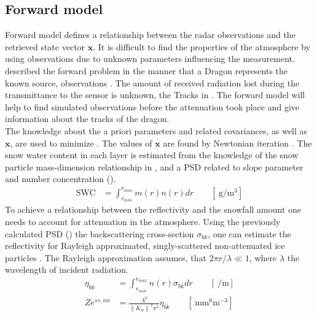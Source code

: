 \subsection{Forward model}\label{sec:forward_model}

Forward model defines a relationship between the radar observations and the retrieved state vector $\mathbf{x}$. It is difficult to find the properties of the atmosphere by using observations due to unknown parameters influencing the measurement. \\
\cite{stephens_remote_1994} described the forward problem in the manner that a Dragon represents the known source, observations . The amount of received radiation lost during the transmittance to the sensor is unknown, the Tracks in . The forward model will help to find simulated observations before the attenuation took place and give information about the tracks of the dragon.  
\\
The knowledge about the a priori parameters and related covariances, as well as $\mathbf{x}$, are used to minimize . The values of $\mathbf{x}$ are found by Newtonian iteration \cite[Eq. 5]{wood_estimating_2014}.
\newline
The snow water content in each layer is estimated from the knowledge of the snow particle mass-dimension relationship in , and a PSD related to slope parameter and number concentration (). %
\begin{align}
	\text{SWC} & = \int_{r_{min}}^{r_{max}} m(r) n(r) dr \qquad [\SI{}{\gram\per\cubic\metre}] \label{eq:SWC}
\end{align}
To achieve a relationship between the reflectivity and the snowfall amount one needs to account for attenuation in the atmosphere. Using the previously calculated PSD () the backscattering cross-section $\sigma_{bk}$, one can estimate the reflectivity for Rayleigh approximated, singly-scattered non-attenuated ice particles \citep{lecuyer_estimation-based_2002,kulie_utilizing_2009,wood_microphysical_2015}. The Rayleigh approximation assumes, that $2\pi r/\lambda \ll 1$, where $\lambda$ the wavelength of incident radiation.
\begin{align}
	\eta_{bk} & = \int_{r_{min}}^{r_{max}} n(r) \sigma_{bk} dr \qquad [\SI{}{\per\metre}] \nonumber \\
	Ze^{ss,na} & = \frac{\Lambda^4}{\left\| K_w \right\|^2 \pi^5} \eta_{bk} \qquad [\SI{}{\mm^6\metre^{-3}}] \label{eq:singleZ}
\end{align}
